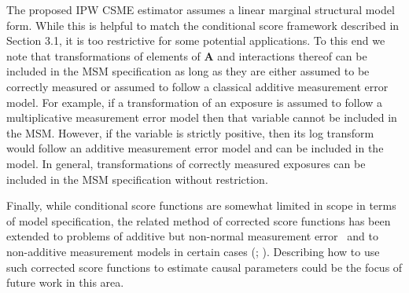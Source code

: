 \documentclass[12pt]{article}
\begin{document}
The proposed IPW CSME estimator assumes a linear marginal structural model form. While this is helpful to match the conditional score framework described in Section 3.1, it is too restrictive for some potential applications. To this end we note that transformations of elements of $\bm{A}$ and interactions thereof can be included in the MSM specification as long as they are either assumed to be correctly measured or assumed to follow a classical additive measurement error model. For example, if a transformation of an exposure is assumed to follow a multiplicative measurement error model then that variable cannot be included in the MSM. However, if the variable is strictly positive, then its log transform would follow an additive measurement error model and can be included in the model. In general, transformations of correctly measured exposures can be included in the MSM specification without restriction.

Finally, while conditional score functions are somewhat limited in scope in terms of model specification, the related method of corrected score functions has been extended to problems of additive but non-normal measurement error~\citep{buzas1996} and to non-additive measurement models in certain cases (\citealp{nakamura1990}; \citealp*{li2004}). Describing how to use such corrected score functions to estimate causal parameters could be the focus of future work in this area.



\end{document}
